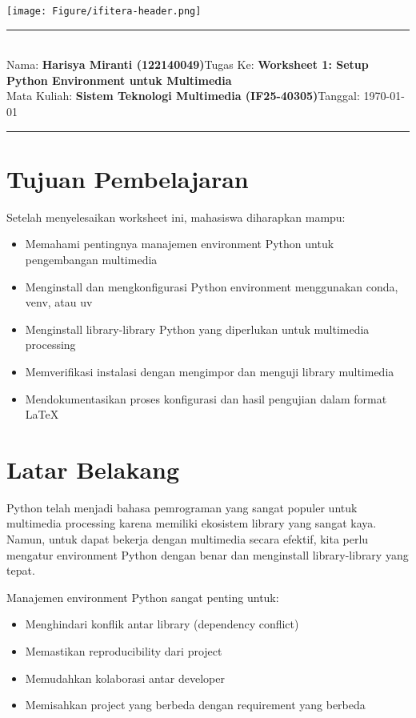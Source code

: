 \documentclass[11pt,a4paper]{article}
\newcommand{\student}{\textbf{Harisya Miranti (122140049)}}
\newcommand{\course}{\textbf{Sistem Teknologi Multimedia (IF25-40305)}}
\newcommand{\assignment}{\textbf{Worksheet 1: Setup Python Environment untuk Multimedia}}
\begin{document}
\thispagestyle{empty}
\begin{center}
	\texttt{[image: Figure/ifitera-header.png]}
	\vspace{0.1cm}
\end{center}
\noindent
\rule{17cm}{0.2cm}\\[0.3cm]
Nama: \student \hfill Tugas Ke: \assignment\\[0.1cm]
Mata Kuliah: \course \hfill Tanggal: \today\\
\rule{17cm}{0.05cm}
\vspace{0.1cm}



\section{Tujuan Pembelajaran}
Setelah menyelesaikan worksheet ini, mahasiswa diharapkan mampu:
\begin{itemize}
    \item Memahami pentingnya manajemen environment Python untuk pengembangan multimedia
    \item Menginstall dan mengkonfigurasi Python environment menggunakan conda, venv, atau uv
    \item Menginstall library-library Python yang diperlukan untuk multimedia processing
    \item Memverifikasi instalasi dengan mengimpor dan menguji library multimedia
    \item Mendokumentasikan proses konfigurasi dan hasil pengujian dalam format \LaTeX
\end{itemize}

\section{Latar Belakang}
Python telah menjadi bahasa pemrograman yang sangat populer untuk multimedia processing karena memiliki ekosistem library yang sangat kaya. Namun, untuk dapat bekerja dengan multimedia secara efektif, kita perlu mengatur environment Python dengan benar dan menginstall library-library yang tepat.

Manajemen environment Python sangat penting untuk:
\begin{itemize}
    \item Menghindari konflik antar library (dependency conflict)
    \item Memastikan reproducibility dari project
    \item Memudahkan kolaborasi antar developer
    \item Memisahkan project yang berbeda dengan requirement yang berbeda
\end{itemize}
\end{document}
